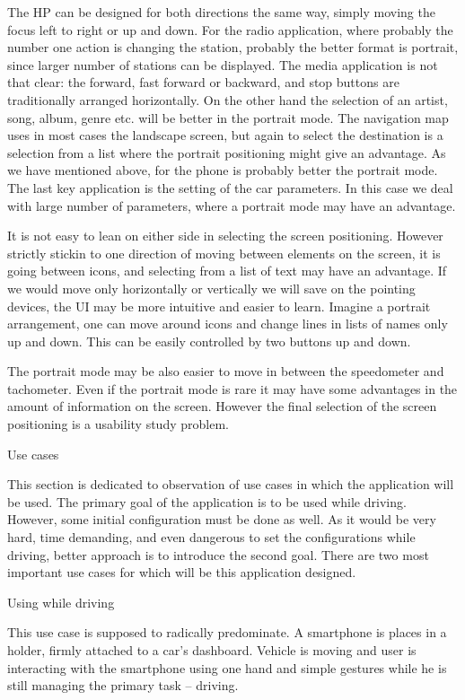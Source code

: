 The HP can be designed for both directions the same way, simply moving the focus left to right or up and down. For the radio application, where probably the number one action is changing the station, probably the better format is portrait, since larger number of stations can be displayed. The media application is not that clear: the forward, fast forward or backward, and stop buttons are traditionally arranged horizontally. On the other hand the selection of an artist, song, album, genre etc. will be better in the portrait mode. The navigation map uses in most cases the landscape screen, but again to select the destination is a selection from a list where the portrait positioning might give an advantage. As we have mentioned above, for the phone is probably better the portrait mode. The last key application is the setting of the car parameters. In this case we deal with large number of parameters, where a portrait mode may have an advantage.

It is not easy to lean on either side in selecting the screen positioning. However strictly stickin to one direction of moving between elements on the screen, it is going between icons, and selecting from a list of text may have an advantage. If we would move only horizontally or vertically we will save on the pointing devices, the UI may be more intuitive and easier to learn. Imagine a portrait arrangement, one can move around icons and change lines in lists of names only up and down. This can be easily controlled by two buttons up and down. 

The portrait mode may be also easier to move in between the speedometer and tachometer. Even if the portrait mode is rare it may have some advantages in the amount of information on the screen. However the final selection of the screen positioning is a usability study problem. 

\secc Use cases

This section is dedicated to observation of use cases in which the application will be used. The primary goal of the application is to be used while driving. However, some initial configuration must be done as well. As it would be very hard, time demanding, and even dangerous to set the configurations while driving, better approach is to introduce the second goal. There are two most important use cases for which will be this application designed.

\seccc Using while driving

This use case is supposed to radically predominate. A smartphone is places in a holder, firmly attached to a car's dashboard. Vehicle is moving and user is interacting with the smartphone using one hand and simple gestures while he is still managing the primary task -- driving. 

